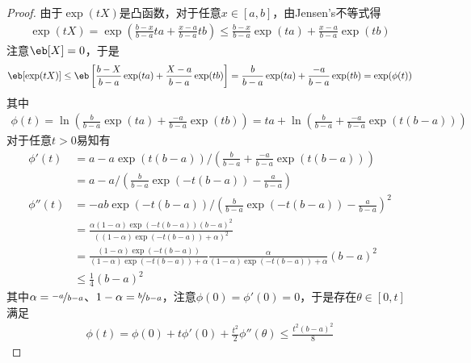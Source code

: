 \documentclass{ctexart}
\begin{document}
\begin{proof}
    由于$\exp(tX)$是凸函数，对于任意$x \in [a,b]$，由Jensen's不等式得
    \begin{align*}
        \exp(tX) = \exp \left( \frac{b - x}{b - a} ta + \frac{x - a}{b - a} tb \right) \le \frac{b - x}{b - a} \exp(ta) + \frac{x - a}{b - a} \exp(tb)
    \end{align*}
    注意$\eb[X] = 0$，于是
    \begin{align*}
        \eb[\exp(tX)] \le \eb \left[\frac{b - X}{b - a} \exp(ta) + \frac{X - a}{b - a} \exp(tb)\right] = \frac{b}{b - a} \exp(ta) + \frac{- a}{b - a} \exp(tb) = \exp (\phi(t))
    \end{align*}
    其中
    \begin{align*}
        \phi(t) = \ln \left( \frac{b}{b - a} \exp(ta) + \frac{- a}{b - a} \exp(tb) \right) = ta + \ln \left( \frac{b}{b - a} + \frac{- a}{b - a} \exp(t(b - a)) \right)
    \end{align*}
    对于任意$t>0$易知有
    \begin{align*}
        \phi'(t)  & = a - a\exp(t(b - a)) \big/ \left( \frac{b}{b - a} + \frac{- a}{b - a} \exp(t(b - a)) \right)                                               \\
                  & = a - a \big/ \left( \frac{b}{b - a} \exp(-t(b - a)) - \frac{a}{b - a}\right)                                                               \\
        \phi''(t) & = -ab\exp(-t(b - a)) \big/ \left( \frac{b}{b - a} \exp(-t(b - a)) - \frac{a}{b - a} \right)^2                                               \\
                  & = \frac{\alpha (1 - \alpha) \exp(-t(b - a)) (b - a)^2}{((1 - \alpha) \exp(-t(b - a)) + \alpha)^2}                                           \\
                  & = \frac{(1 - \alpha) \exp(-t(b - a))}{(1 - \alpha) \exp(-t(b - a)) + \alpha} \frac{\alpha}{(1 - \alpha) \exp(-t(b - a)) + \alpha} (b - a)^2 \\
                  & \le \frac{1}{4} (b - a)^2
    \end{align*}
    其中$\alpha = \nicefrac{-a}{b - a}$、$1 - \alpha = \nicefrac{b}{b - a}$，注意$\phi(0) = \phi'(0) = 0$，于是存在$\theta \in [0, t]$满足
    \begin{align*}
        \phi(t) = \phi(0) + t \phi'(0) + \frac{t^2}{2} \phi''(\theta) \le \frac{t^2(b-a)^2}{8}
    \end{align*}
\end{proof}
\end{document}

